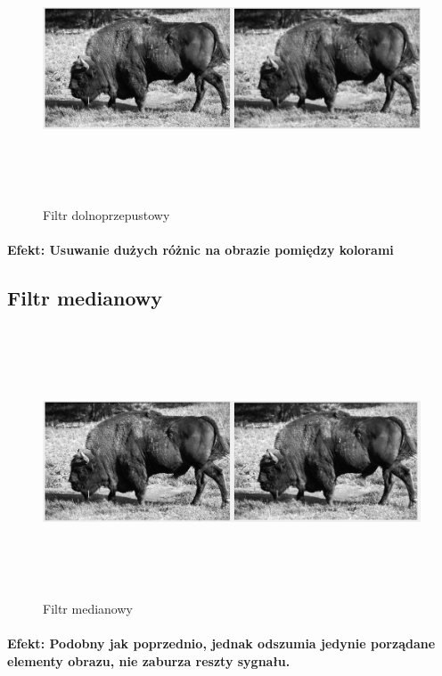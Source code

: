 \documentclass[a4paper,12pt]{article}
\begin{document}
\begin{justify}
\begin{figure}[h!]
\centering
\includegraphics[width=18cm, height=8cm]{6}
\caption{Filtr dolnoprzepustowy}
\end{figure}

\paragraph{Efekt: Usuwanie dużych różnic na obrazie pomiędzy kolorami}

\newpage

\subsection{Filtr medianowy}

\begin{figure}[h!]
\centering
\includegraphics[width=18cm, height=8cm]{7}
\caption{Filtr medianowy}
\end{figure}

\paragraph{Efekt: Podobny jak poprzednio, jednak odszumia jedynie porządane elementy obrazu, nie zaburza reszty sygnału.}


\end{justify}
\end{document}
